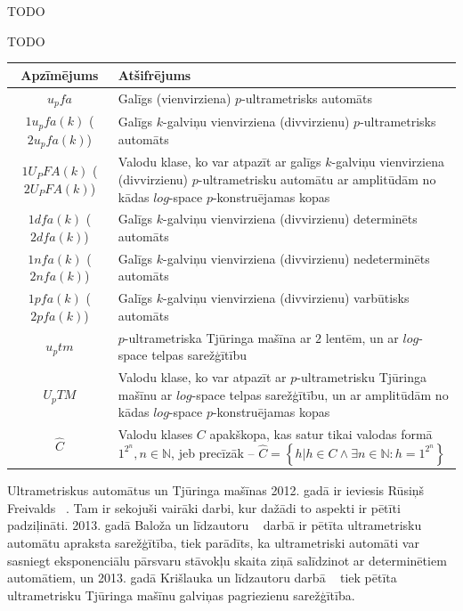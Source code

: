 \documentclass{ludis}
\begin{document}
\maketitle

\begin{abstract-lv}
TODO
\end{abstract-lv}
\clearpage

\begin{abstract-en}
TODO
\end{abstract-en}


\tableofcontents

\setlength\LTleft{0pt}
\setlength\LTright{0pt}
\begin{longtable}{| c | p{28em} |}
  \hline
  \textbf{Apzīmējums} & \textbf{Atšifrējums}\\ 
  \endhead

  \hline
  $u_pfa$ & Galīgs (vienvirziena) $p$-ultrametrisks automāts\\
  $1u_pfa(k)$ ($2u_pfa(k)$) &  Galīgs $k$-galviņu vienvirziena (divvirzienu) $p$-ultrametrisks automāts\\
  $1U_PFA(k)$ ($2U_PFA(k)$) &  Valodu klase, ko var atpazīt ar galīgs $k$-galviņu vienvirziena (divvirzienu) $p$-ultrametrisku automātu ar amplitūdām no kādas $log$-space $p$-konstruējamas kopas\\
  $1dfa(k)$ ($2dfa(k)$) &  Galīgs $k$-galviņu vienvirziena (divvirzienu) determinēts automāts\\
  $1nfa(k)$ ($2nfa(k)$) &  Galīgs $k$-galviņu vienvirziena (divvirzienu) nedeterminēts automāts\\
  $1pfa(k)$ ($2pfa(k)$) &  Galīgs $k$-galviņu vienvirziena (divvirzienu) varbūtisks automāts\\
  $u_ptm$ &  $p$-ultrametriska Tjūringa mašīna ar $2$ lentēm, un ar $log$-space telpas sarežģītību\\
  $U_pTM$ &  Valodu klase, ko var atpazīt ar $p$-ultrametrisku Tjūringa mašīnu ar $log$-space telpas sarežģītību, un ar amplitūdām no kādas $log$-space $p$-konstruējamas kopas\\
  $\widehat{C}$ & Valodu klases $C$ apakškopa, kas satur tikai valodas formā $1^{2^n}, n \in \mathbb{N}$, jeb precīzāk -- $\widehat{C} = \left\{ h | h \in C \wedge \exists n \in \mathbb{N} : h = 1^{2^n} \right\}$\\
  \hline
\end{longtable}

Ultrametriskus automātus un Tjūringa mašīnas 2012. gadā ir ieviesis Rūsiņš Freivalds ~\citep{Freivalds2012}. Tam ir sekojuši vairāki darbi, kur dažādi to aspekti ir pētīti padziļināti. 2013. gadā Baloža un līdzautoru ~\citep{KasparsBalodis2013} darbā ir pētīta ultrametrisku automātu apraksta sarežģītība,
tiek parādīts, ka ultrametriski automāti var sasniegt eksponenciālu pārsvaru stāvokļu skaita ziņā salīdzinot ar determinētiem automātiem, un 2013. gadā Krišlauka un līdzautoru darbā ~\citep{Krislauks2013} tiek pētīta ultrametrisku Tjūringa mašīnu galviņas pagriezienu sarežģītība.
\end{document}
